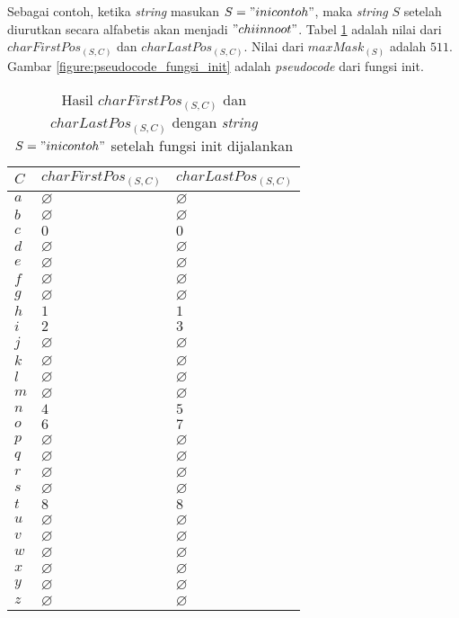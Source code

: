 Sebagai contoh, ketika \textit{string} masukan $ S="inicontoh" $, maka \textit{string} $ S $ setelah diurutkan secara alfabetis akan menjadi $ "chiinnoot" $. Tabel \ref{tab:hasil_init} adalah nilai dari $charFirstPos_{(S, C)}$ dan $charLastPos_{(S, C)}$. Nilai dari $ maxMask_{(S)} $ adalah $ 511 $. Gambar \ref{figure:pseudocode_fungsi_init} adalah \textit{pseudocode} dari fungsi init.

\begin{table}
	\centering
	\begin{tabular} {|l|l|l|} \hline
		$C$ & $ charFirstPos_{(S,C)} $ & $ charLastPos_{(S,C)} $ \\ \hline
	$ a $ & $ \varnothing $ & $ \varnothing $ \\ \hline
	$ b $ & $ \varnothing $ & $ \varnothing $ \\ \hline
	$ c $ & $ 0 $ & $ 0 $ \\ \hline
	$ d $ & $ \varnothing $ & $ \varnothing $ \\ \hline
	$ e $ & $ \varnothing $ & $ \varnothing $ \\ \hline
	$ f $ & $ \varnothing $ & $ \varnothing $ \\ \hline
	$ g $ & $ \varnothing $ & $ \varnothing $ \\ \hline
	$ h $ & $ 1 $ & $ 1 $ \\ \hline
	$ i $ & $ 2 $ & $ 3 $ \\ \hline
	$ j $ & $ \varnothing $ & $ \varnothing $ \\ \hline
	$ k $ & $ \varnothing $ & $ \varnothing $ \\ \hline
	$ l $ & $ \varnothing $ & $ \varnothing $ \\ \hline
	$ m $ & $ \varnothing $ & $ \varnothing $ \\ \hline
	$ n $ & $ 4 $ & $ 5 $ \\ \hline
	$ o $ & $ 6 $ & $ 7 $ \\ \hline
	$ p $ & $ \varnothing $ & $ \varnothing $ \\ \hline
	$ q $ & $ \varnothing $ & $ \varnothing $ \\ \hline
	$ r $ & $ \varnothing $ & $ \varnothing $ \\ \hline
	$ s $ & $ \varnothing $ & $ \varnothing $ \\ \hline
	$ t $ & $ 8 $ & $ 8 $ \\ \hline
	$ u $ & $ \varnothing $ & $ \varnothing $ \\ \hline
	$ v $ & $ \varnothing $ & $ \varnothing $ \\ \hline
	$ w $ & $ \varnothing $ & $ \varnothing $ \\ \hline
	$ x $ & $ \varnothing $ & $ \varnothing $ \\ \hline
	$ y $ & $ \varnothing $ & $ \varnothing $ \\ \hline
	$ z $ & $ \varnothing $ & $ \varnothing $ \\ \hline	
	\end{tabular}\caption{Hasil $ charFirstPos_{(S, C)} $ dan $ charLastPos_{(S, C)} $ dengan \textit{string} $ S="inicontoh" $ setelah fungsi init dijalankan}
	\label{tab:hasil_init}
\end{table}


